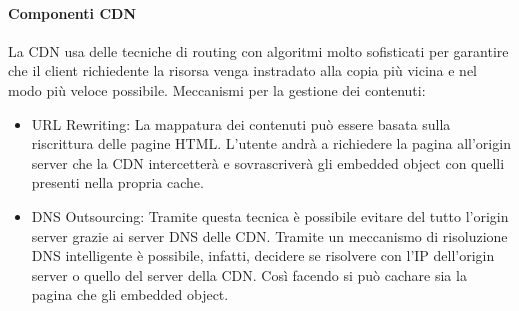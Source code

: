 \documentclass{article}
\begin{document}
		\paragraph{Componenti CDN}
		La CDN usa delle tecniche di routing con algoritmi molto sofisticati per garantire che il client richiedente la risorsa venga instradato alla copia più vicina e nel modo più veloce possibile.
		Meccanismi per la gestione dei contenuti:
		\begin{itemize}
			\item URL Rewriting: La mappatura dei contenuti può essere basata sulla riscrittura delle pagine HTML. L'utente andrà a richiedere la pagina all'origin server che la CDN intercetterà e sovrascriverà gli embedded object con quelli presenti nella propria cache.
			\item DNS Outsourcing: Tramite questa tecnica è possibile evitare del tutto l'origin server grazie ai server DNS delle CDN. Tramite un meccanismo di risoluzione DNS intelligente è possibile, infatti, decidere se risolvere con l'IP dell'origin server o quello del server della CDN. Così facendo si può cachare sia la pagina che gli embedded object.
		\end{itemize}
		
\end{document}
